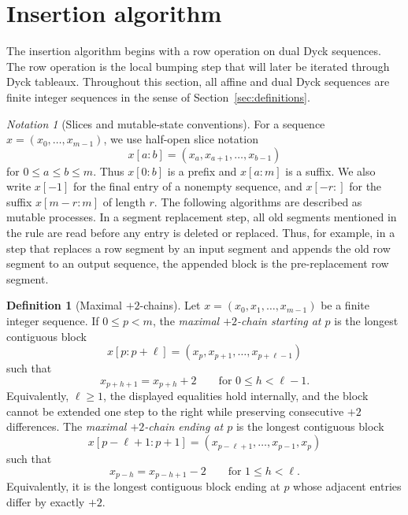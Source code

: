 \documentclass[11pt]{article}
\theoremstyle{plain}
\theoremstyle{definition}
\newtheorem{definition}[theorem]{Definition}
\theoremstyle{remark}
\newtheorem*{notation}{Notation}
\begin{document}
\section{Insertion algorithm}
\label{sec:insertion-algorithm}
The insertion algorithm begins with a row operation on dual Dyck sequences.
The row operation is the local bumping step that will later be iterated through
Dyck tableaux.  Throughout this section, all affine and dual Dyck sequences are
finite integer sequences in the sense of Section~\ref{sec:definitions}.
\begin{notation}[Slices and mutable-state conventions]
For a sequence \(x=(x_0,\ldots,x_{m-1})\), we use half-open slice notation
\[
  x[a:b]=(x_a,x_{a+1},\ldots,x_{b-1})
\]
for \(0\le a\le b\le m\).  Thus \(x[0:b]\) is a prefix and \(x[a:m]\) is a
suffix.  We also write \(x[-1]\) for the final entry of a nonempty sequence,
and \(x[-r:]\) for the suffix \(x[m-r:m]\) of length \(r\).
The following algorithms are described as mutable processes.  In a segment
replacement step, all old segments mentioned in the rule are read before any
entry is deleted or replaced.  Thus, for example, in a step that replaces a row
segment by an input segment and appends the old row segment to an output
sequence, the appended block is the pre-replacement row segment.
\end{notation}
\begin{definition}[Maximal \(+2\)-chains]
\label{def:maximal-plus-two-chains}
Let \(x=(x_0,x_1,\ldots,x_{m-1})\) be a finite integer sequence.
If \(0\le p<m\), the \emph{maximal \(+2\)-chain starting at \(p\)} is the
longest contiguous block
\[
  x[p:p+\ell]=(x_p,x_{p+1},\ldots,x_{p+\ell-1})
\]
such that
\[
  x_{p+h+1}=x_{p+h}+2
  \qquad\text{for }0\le h<\ell-1.
\]
Equivalently, \(\ell\ge 1\), the displayed equalities hold internally, and the
block cannot be extended one step to the right while preserving consecutive
\(+2\) differences.
The \emph{maximal \(+2\)-chain ending at \(p\)} is the longest contiguous block
\[
  x[p-\ell+1:p+1]=(x_{p-\ell+1},\ldots,x_{p-1},x_p)
\]
such that
\[
  x_{p-h}=x_{p-h+1}-2
  \qquad\text{for }1\le h<\ell.
\]
Equivalently, it is the longest contiguous block ending at \(p\) whose adjacent
entries differ by exactly \(+2\).
\end{definition}
\end{document}
